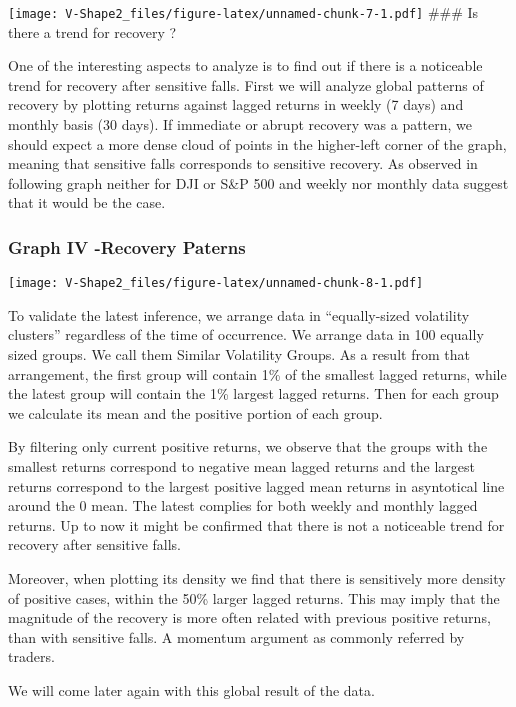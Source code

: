 \documentclass[
]{article}
\begin{document}
\texttt{[image: V-Shape2\_files/figure-latex/unnamed-chunk-7-1.pdf]}
\#\#\# Is there a trend for recovery ?

One of the interesting aspects to analyze is to find out if there is a
noticeable trend for recovery after sensitive falls. First we will
analyze global patterns of recovery by plotting returns against lagged
returns in weekly (7 days) and monthly basis (30 days). If immediate or
abrupt recovery was a pattern, we should expect a more dense cloud of
points in the higher-left corner of the graph, meaning that sensitive
falls corresponds to sensitive recovery. As observed in following graph
neither for DJI or S\&P 500 and weekly nor monthly data suggest that it
would be the case.

\hypertarget{graph-iv--recovery-paterns}{%
\subsubsection{Graph IV -Recovery
Paterns}\label{graph-iv--recovery-paterns}}

\texttt{[image: V-Shape2\_files/figure-latex/unnamed-chunk-8-1.pdf]}

To validate the latest inference, we arrange data in ``equally-sized
volatility clusters'' regardless of the time of occurrence. We arrange
data in 100 equally sized groups. We call them Similar Volatility
Groups. As a result from that arrangement, the first group will contain
1\% of the smallest lagged returns, while the latest group will contain
the 1\% largest lagged returns. Then for each group we calculate its
mean and the positive portion of each group.

By filtering only current positive returns, we observe that the groups
with the smallest returns correspond to negative mean lagged returns and
the largest returns correspond to the largest positive lagged mean
returns in asyntotical line around the 0 mean. The latest complies for
both weekly and monthly lagged returns. Up to now it might be confirmed
that there is not a noticeable trend for recovery after sensitive falls.

Moreover, when plotting its density we find that there is sensitively
more density of positive cases, within the 50\% larger lagged returns.
This may imply that the magnitude of the recovery is more often related
with previous positive returns, than with sensitive falls. A momentum
argument as commonly referred by traders.

We will come later again with this global result of the data.
\end{document}
